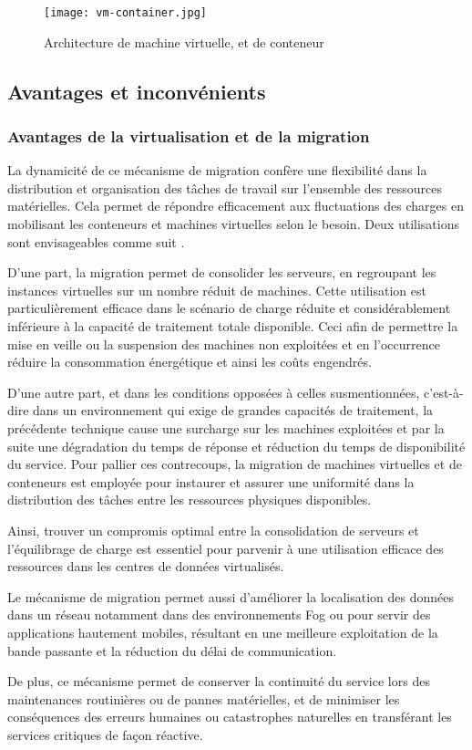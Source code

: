 \begin{figure}[H]
\centering
\texttt{[image: vm-container.jpg]}
\caption{Architecture de machine virtuelle, et de conteneur \cite{alibabacloud}}
\label{fig:vmvsconteneur}
\end{figure}

\subsection{Avantages et inconvénients}
\subsubsection{Avantages de la virtualisation et de la migration}
La dynamicité de ce mécanisme de migration confère une flexibilité dans la distribution et organisation des tâches de travail sur l'ensemble des ressources matérielles. Cela permet de répondre efficacement aux fluctuations des charges en mobilisant les conteneurs et machines virtuelles selon le besoin. Deux utilisations sont envisageables comme suit \cite{boutaba2013}.\par
D'une part, la migration permet de consolider les serveurs, en regroupant les instances virtuelles sur un nombre réduit de machines. Cette utilisation est particulièrement efficace dans le scénario de charge réduite et considérablement inférieure à la capacité de traitement totale disponible. Ceci afin de permettre la mise en veille ou la suspension des machines non exploitées et en l'occurrence réduire la consommation énergétique et ainsi les coûts engendrés.\par
D'une autre part, et dans les conditions opposées à celles susmentionnées, c'est-à-dire dans un environnement qui exige de grandes capacités de traitement, la précédente technique cause une surcharge sur les machines exploitées et par la suite une dégradation du temps de réponse et réduction du temps de disponibilité du service. Pour pallier ces contrecoups, la migration de machines virtuelles et de conteneurs est employée pour instaurer et assurer une uniformité dans la distribution des tâches entre les ressources physiques disponibles.\par
Ainsi, trouver un compromis optimal entre la consolidation de serveurs et l'équilibrage de charge est essentiel pour parvenir à une utilisation efficace des ressources dans les centres de données virtualisés.\par
Le mécanisme de migration permet aussi d'améliorer la localisation des données dans un réseau notamment dans des environnements Fog ou pour servir des applications hautement mobiles, résultant en une meilleure exploitation de la bande passante et la réduction du délai de communication.\par
De plus, ce mécanisme permet de conserver la continuité du service lors des maintenances routinières ou de pannes matérielles, et de minimiser les conséquences des erreurs humaines ou catastrophes naturelles en transférant les services critiques de façon réactive.

